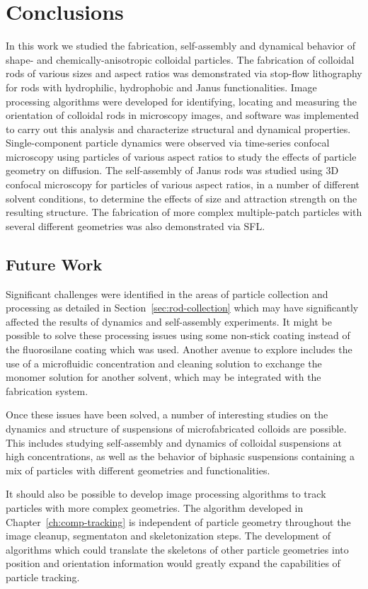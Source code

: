 \chapter{Conclusions}
\label{ch:conclusions}

In this work we studied the fabrication, self-assembly and dynamical behavior
of shape- and chemically-anisotropic colloidal particles.  The fabrication 
of colloidal rods of various sizes and aspect ratios was demonstrated via
stop-flow lithography for rods with
hydrophilic, hydrophobic and Janus functionalities.  Image processing algorithms
were developed for identifying, locating and measuring the orientation of 
colloidal rods in microscopy images, and software was implemented to carry out
this analysis and characterize structural and dynamical properties.
Single-component particle 
dynamics were observed via time-series confocal microscopy using particles of 
various aspect ratios to study the effects of particle geometry on diffusion.
The self-assembly of Janus rods was studied using
3D confocal microscopy for particles of various aspect ratios,
in a number of different solvent conditions, to determine the effects of size 
and attraction strength on the resulting structure.  The fabrication of more complex
multiple-patch particles with several different geometries was also demonstrated via SFL.

\section{Future Work}

Significant challenges were identified in the areas of particle collection and processing as 
detailed in Section~\ref{sec:rod-collection} which may have significantly affected the 
results of dynamics and self-assembly experiments.  It might be possible to solve these
processing issues using some non-stick coating instead of the fluorosilane coating 
which was used.  Another avenue to explore includes the use of a microfluidic concentration
and cleaning solution to exchange the monomer solution for another solvent, 
which may be integrated with the fabrication system.  

Once these issues have been solved, a number of interesting studies on the dynamics and
structure of suspensions of microfabricated colloids are possible.  This includes studying 
self-assembly and dynamics of colloidal suspensions at high concentrations, as well as 
the behavior of biphasic suspensions containing a mix of particles with different geometries and
functionalities.

It should also be possible to develop image processing algorithms to track particles with more
complex geometries.  The algorithm developed in Chapter~\ref{ch:comp-tracking} is independent 
of particle geometry throughout the image cleanup, segmentaton and skeletonization steps.
The development of algorithms which could translate the skeletons of other particle 
geometries into position and orientation information would greatly expand the 
capabilities of particle tracking.
